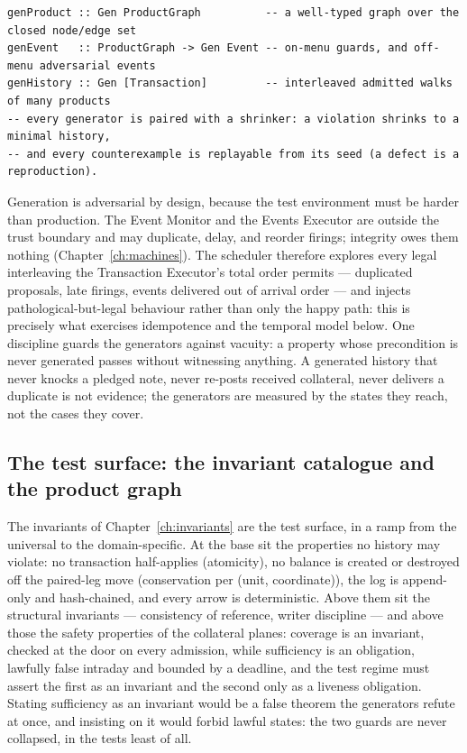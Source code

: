 \begin{lstlisting}
genProduct :: Gen ProductGraph          -- a well-typed graph over the closed node/edge set
genEvent   :: ProductGraph -> Gen Event -- on-menu guards, and off-menu adversarial events
genHistory :: Gen [Transaction]         -- interleaved admitted walks of many products
-- every generator is paired with a shrinker: a violation shrinks to a minimal history,
-- and every counterexample is replayable from its seed (a defect is a reproduction).
\end{lstlisting}

Generation is adversarial by design, because the test environment must be harder than
production. The Event Monitor and the Events Executor are outside the trust boundary and may
duplicate, delay, and reorder firings; integrity owes them nothing
(Chapter~\ref{ch:machines}). The scheduler therefore explores every legal interleaving the
Transaction Executor's total order permits --- duplicated proposals, late firings, events
delivered out of arrival order --- and injects pathological-but-legal behaviour rather than
only the happy path: this is precisely what exercises idempotence and the temporal model
below. One discipline guards the generators against vacuity: a property whose precondition
is never generated passes without witnessing anything. A generated history that never knocks
a pledged note, never re-posts received collateral, never delivers a duplicate is not
evidence; the generators are measured by the states they reach, not the cases they cover.

\subsection{The test surface: the invariant catalogue and the product graph}

The invariants of Chapter~\ref{ch:invariants} are the test surface, in a ramp from the
universal to the domain-specific. At the base sit the properties no history may violate: no
transaction half-applies (atomicity), no balance is created or destroyed off the paired-leg
move (conservation per (unit, coordinate)), the log is append-only and hash-chained, and
every arrow is deterministic. Above them sit the structural invariants --- consistency of
reference, writer discipline --- and above those the safety properties of the collateral
planes: coverage is an invariant, checked at the door on every admission, while sufficiency
is an obligation, lawfully false intraday and bounded by a deadline, and the test regime
must assert the first as an invariant and the second only as a liveness obligation. Stating
sufficiency as an invariant would be a false theorem the generators refute at once, and
insisting on it would forbid lawful states: the two guards are never collapsed, in the tests
least of all.


